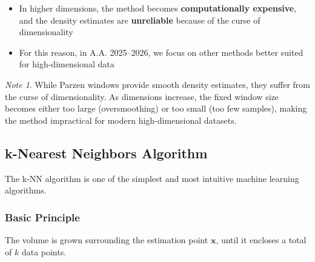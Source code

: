 \documentclass[11pt,a4paper]{article}
\theoremstyle{definition}
\theoremstyle{plain}
\theoremstyle{remark}
\newtheorem*{remark}{Note}
\begin{document}
\begin{itemize}
    \item In higher dimensions, the method becomes \textbf{computationally expensive}, and the density estimates are \textbf{unreliable} because of the curse of dimensionality
    
    \item For this reason, in A.A. 2025–2026, we focus on other methods better suited for high-dimensional data
\end{itemize}

\begin{remark}
While Parzen windows provide smooth density estimates, they suffer from the curse of dimensionality. As dimensions increase, the fixed window size becomes either too large (oversmoothing) or too small (too few samples), making the method impractical for modern high-dimensional datasets.
\end{remark}

\subsection{k-Nearest Neighbors Algorithm}

The k-NN algorithm is one of the simplest and most intuitive machine learning algorithms.

\subsubsection{Basic Principle}

The volume is grown surrounding the estimation point $\mathbf{x}$, until it encloses a total of $k$ data points.

\begin{center}
\end{center}
\end{document}
